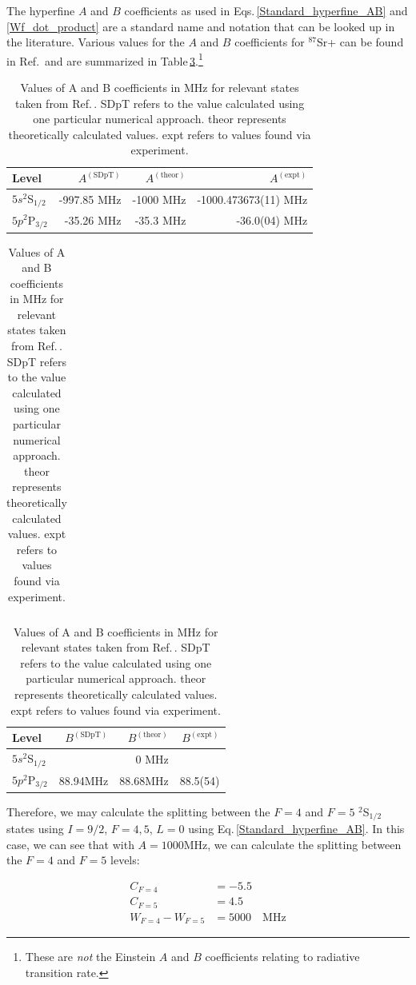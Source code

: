 The hyperfine $A$ and $B$ coefficients as used in Eqs.\,\ref{Standard_hyperfine_AB} and \ref{Wf_dot_product} are a standard name and notation that can be looked up in the literature\cite{cuaMITnotes}.  Various values for the $A$ and $B$ coefficients for $^{87}$Sr+ can be found in Ref.\,\cite{safronova2photon} and are summarized in Table\,\ref{AB_table}.\footnote{These are \emph{not} the Einstein $A$ and $B$ coefficients relating to radiative transition rate.}   
\begin{table}[h]
\centering
\begin{tabular}{|l|r|r|r|}
\hline
Level &  $A^{\mathrm{(SDpT)}}$ &$A^{\mathrm{(theor)}}$ & $A^{\mathrm{(expt)}}$ \\ \hline \hline
$5s ^2$S$_{1/2}$&-997.85 MHz& -1000 MHz& -1000.473673(11) MHz\\ \hline
$5p ^2$P$_{3/2}$&-35.26 MHz&-35.3 MHz&-36.0(04) MHz\\ \hline
\end{tabular}

\begin{tabular}{l}
\end{tabular}

\begin{tabular}{|l|r|r|r|}
\hline
Level &  $B^{\mathrm{(SDpT)}}$ &$B^{\mathrm{(theor)}}$ & $B^{\mathrm{(expt)}}$ \\ \hline \hline
$5s ^2$S$_{1/2}$&&0  MHz&  \\ \hline
$5p ^2$P$_{3/2}$&88.94MHz&$88.68$MHz\footnotemark&88.5(54) \\ \hline
\end{tabular}
\caption{Values of A and B coefficients in MHz for relevant states taken from Ref.\,\cite{safronova2photon}. SDpT refers to the value calculated using one particular numerical approach. theor represents theoretically calculated values. expt refers to values found via experiment.\label{AB_table}
}
\end{table}

Therefore, we may calculate the splitting between the $F=4$ and $F=5$ $^2$S$_{1/2}$ states using $I=9/2$, $F=4,5$, $L=0$ using Eq.\,\ref{Standard_hyperfine_AB}. In this case, we can see that with $A=1000$MHz, we can calculate the splitting between the $F=4$ and $F=5$ levels: 

\begin{align}
C_{F=4} &= -5.5\\
C_{F=5} &= 4.5\\
W_{F=4}-W_{F=5}&=5000 \quad \mathrm{MHz}
\end{align}

